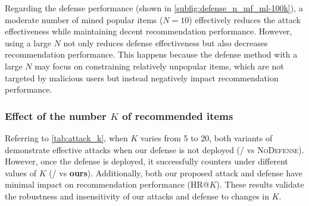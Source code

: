Regarding the defense performance (shown in \cref{subfig:defense_n_mf_ml-100k}), a moderate number of mined popular items ($N=10$) effectively reduces the attack effectiveness while maintaining decent recommendation performance. However, using a large $N$ not only reduces defense effectiveness but also decreases recommendation performance. This happens because the defense method with a large $N$ may focus on constraining relatively unpopular items, which are not targeted by malicious users but instead negatively impact recommendation performance.

\subsubsection{Effect of the number \texorpdfstring{$K$}{Lg} of recommended items}
Referring to \cref{tab:attack_k}, when $K$ varies from 5 to 20, both variants of \model{} demonstrate effective attacks when our defense is not deployed (\modelI{}/\modelII{} vs \textsc{NoDefense}). However, once the defense is deployed, it successfully counters \model{} under different values of $K$ (\modelI{}/\modelII{} vs \textbf{ours}). Additionally, both our proposed attack and defense have minimal impact on recommendation performance (HR@$K$). These results validate the robustness and insensitivity of our attacks and defense to changes in $K$.

\begin{table}[tb]
\end{table}

